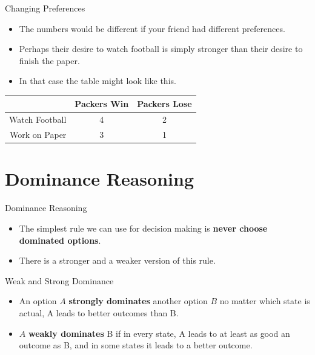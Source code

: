 \documentclass[
  ignorenonframetext,
]{beamer}
\providecommand{\tightlist}{%
  \setlength{\itemsep}{0pt}\setlength{\parskip}{0pt}}
\renewcommand{\,}{\text{, }}
\begin{document}
\begin{frame}{Changing Preferences}
\protect\hypertarget{changing-preferences}{}

\begin{itemize}
\tightlist
\item
  The numbers would be different if your friend had different
  preferences.
\item
  Perhaps their desire to watch football is simply stronger than their
  desire to finish the paper.
\item
  In that case the table might look like this.
\end{itemize}

\begin{longtable}[]{@{}rcc@{}}
\toprule
& Packers Win & Packers Lose\tabularnewline
\midrule
\endhead
Watch Football & 4 & 2\tabularnewline
Work on Paper & 3 & 1\tabularnewline
\bottomrule
\end{longtable}

\end{frame}

\hypertarget{dominance-reasoning}{%
\section{Dominance Reasoning}\label{dominance-reasoning}}

\begin{frame}{Dominance Reasoning}
\protect\hypertarget{dominance-reasoning-1}{}

\begin{itemize}
\tightlist
\item
  The simplest rule we can use for decision making is \textbf{never
  choose dominated options}.
\item
  There is a stronger and a weaker version of this rule.
\end{itemize}

\end{frame}

\begin{frame}{Weak and Strong Dominance}
\protect\hypertarget{weak-and-strong-dominance}{}

\begin{itemize}
\tightlist
\item
  An option \(A\) \textbf{strongly dominates} another option \(B\) no
  matter which state is actual, A leads to better outcomes than B.
  \pause 
\item
  \(A\) \textbf{weakly dominates} B if in every state, A leads to at
  least as good an outcome as B, and in some states it leads to a better
  outcome.
\end{itemize}

\end{frame}
\end{document}
